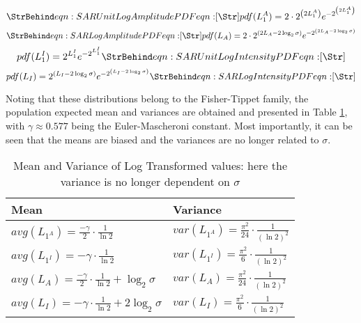 \begin{equation}
  \label{eqn:SAR Unit Log Amplitude PDF}
  \caption{eqn:SAR Unit Log Amplitude PDF}
pdf(L_{1}^{A}) = 2 \cdot 2^{\left( 2 L_{1}^{A} \right)}e^{-2^{\left( 2 L_{1}^{A} \right) }} 
\end{equation}
\begin{equation}
  \label{eqn:SAR Log Amplitude PDF}
  \caption{eqn:SAR Log Amplitude PDF}
pdf(L_A) = 2 \cdot 2^{\left( 2 L_A - 2 \log_2 \sigma \right)}e^{-2^{\left( 2 L_A - 2 \log_2 \sigma \right)}} 
\end{equation}
\begin{equation}
pdf(L_{1}^{I}) = 2^{L_1^I} e^{-2^{L_1^I}}  
  \caption{eqn:SAR Unit Log Intensity PDF}
  \label{eqn:SAR Unit Log Intensity PDF}
\end{equation}
\begin{equation}
pdf(L_I) = 2^{\left( L_I - 2 \log_2 \sigma \right)} e^{-2^{\left( L_I - 2 \log_2 \sigma \right)} }  
  \caption{eqn:SAR Log Intensity PDF}
  \label{eqn:SAR Log Intensity PDF}
\end{equation}

Noting that these distributions belong to the Fisher-Tippet family, the population expected mean and variances 
are obtained and presented in Table \ref{tbl:sar_log_domain_avg_var}, with $\gamma \approx 0.577$ being the Euler-Mascheroni constant. 
Most importantly, it can be seen that the means are biased and the variances are no longer related to $\sigma$. 

\begin{table}[h]
\normalsize
\centering
\caption{ Mean and Variance of Log Transformed values: here the variance is no longer dependent on $\sigma$ }
\label{tbl:sar_log_domain_avg_var}
\begin{tabular}{|l|l|}
\hline
Mean & Variance \\
\hline
$avg(L_{1^A}) = \frac{ - \gamma }{2} \cdot \frac{1}{\ln2}$ & $var(L_{1^A}) = \frac{ \pi ^2}{24} \cdot \frac{1}{(\ln2)^2}$ \\
$avg(L_{1^I}) = - \gamma \cdot \frac{1}{\ln2} $ & $var(L_{1^I}) = \frac{ \pi ^2}{6} \cdot \frac{1}{(\ln2)^2} $ \\
$avg(L_A) = \frac{ - \gamma }{2} \cdot \frac{1}{\ln2} + \log_2{\sigma}$ & $var(L_A) = \frac{ \pi ^2}{24} \cdot \frac{1}{(\ln2)^2}$ \\
$avg(L_I) = - \gamma \cdot \frac{1}{\ln2} + 2 \log_2{\sigma}  $ & $ var(L_I) = \frac{ \pi ^2}{6} \cdot \frac{1}{(\ln2)^2}$ \\
\hline
\end{tabular}
\end{table}

